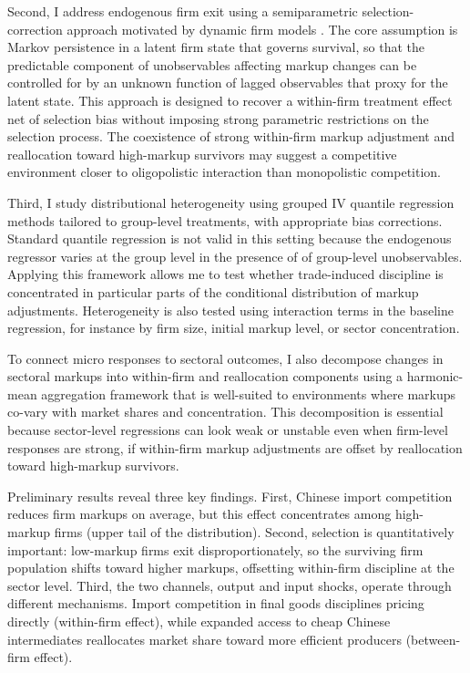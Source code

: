 \documentclass[12pt]{article}
\begin{document}
Second, I address endogenous firm exit using a semiparametric selection-correction approach motivated by dynamic firm models \parencite{ericsonMarkovPerfectIndustryDynamics1995,backusWhyProductivityCorrelated2020}. The core assumption is Markov persistence in a latent firm state that governs survival, so that the predictable component of unobservables affecting markup changes can be controlled for by an unknown function of lagged observables that proxy for the latent state. This approach is designed to recover a within-firm treatment effect net of selection bias without imposing strong parametric restrictions on the selection process. The coexistence of strong within-firm markup adjustment and reallocation toward high-markup survivors may suggest a competitive environment closer to oligopolistic interaction than monopolistic competition.

Third, I study distributional heterogeneity using grouped IV quantile regression methods tailored to group-level treatments, with appropriate bias corrections. Standard quantile regression is not valid in this setting because the endogenous regressor varies at the group level in the presence of of group-level unobservables. Applying this framework allows me to test whether trade-induced discipline is concentrated in particular parts of the conditional distribution of markup adjustments. Heterogeneity is also tested using interaction terms in the baseline regression, for instance by firm size, initial markup level, or sector concentration.

To connect micro responses to sectoral outcomes, I also decompose changes in sectoral markups into within-firm and reallocation components using a harmonic-mean aggregation framework that is well-suited to environments where markups co-vary with market shares and concentration. This decomposition is essential because sector-level regressions can look weak or unstable even when firm-level responses are strong, if within-firm markup adjustments are offset by reallocation toward high-markup survivors.

Preliminary results reveal three key findings. First, Chinese import competition reduces firm markups on average, but this effect concentrates among high-markup firms (upper tail of the distribution). Second, selection is quantitatively important: low-markup firms exit disproportionately, so the surviving firm population shifts toward higher markups, offsetting within-firm discipline at the sector level. Third, the two channels, output and input shocks, operate through different mechanisms. Import competition in final goods disciplines pricing directly (within-firm effect), while expanded access to cheap Chinese intermediates reallocates market share toward more efficient producers (between-firm effect).
\end{document}
